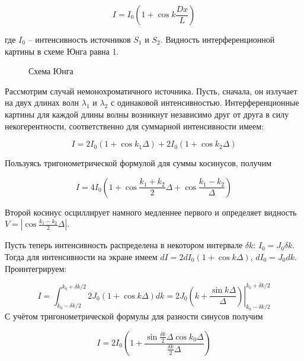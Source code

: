 \begin{equation}
    I = I_0 \left( 1 + \cos k \frac{D x}{L} \right)
\end{equation}

\noindent
где $I_0$ -- интенсивность источников $S_1$ и $S_2$. Видность интерференционной картины в схеме Юнга равна 1.

\begin{figure}[htbp]
    \centering
    
    \caption{Схема Юнга}
    \label{fig:схема Юнга}
\end{figure}

Рассмотрим случай немонохроматичного источника. Пусть, сначала, он излучает на двух длинах волн $\lambda_1$ и $\lambda_2$ с одинаковой интенсивностью. Интерференционные картины для каждой длины волны возникнут независимо друг от друга в силу некогерентности, соответственно для суммарной интенсивности имеем:

\begin{equation*}
    I = 2 I_0 (1 + \cos k_1 \Delta) + 2 I_0 (1 + \cos k_2 \Delta)
\end{equation*}

\noindent
Пользуясь тригонометрической формулой для суммы косинусов, получим

\begin{equation}
    I = 4 I_0 ( 1 + \cos \frac{k_1 + k_2}{2} \Delta + \cos \frac{k_1 - k_2}{\Delta})
\end{equation}

\noindent
Второй косинус осциллирует намного медленнее первого и определяет видность $V = \left| \cos \frac{k_1 - k_2}{2} \Delta \right|$.

Пусть теперь интенсивность распределена в некотором интервале $\delta k$: $I_0 = J_0 \delta k$. Тогда для интенсивности на экране имеем $dI = 2 d I_0 \left( 1 + \cos k \Delta \right)$, $d I_0 = J_0 d k$. Проинтегрируем:

\begin{equation*}
    I = \int_{k_0 - \delta k / 2}^{k_0 + \delta k / 2} 2 J_0 \left( 1 + \cos k \Delta \right) d k = \left. 2 J_0 \left( k + \frac{\sin k \Delta}{\Delta} \right) \right|_{k_0 - \delta k / 2}^{k_0 + \delta k / 2}
\end{equation*}
\noindent
С учётом тригонометрической формулы для разности синусов получим

\begin{equation}
    I = 2 I_0 \left( 1 + \frac{\sin \frac{\delta k}{2} \Delta \cos k_0 \Delta}{\frac{\delta k}{2} \Delta} \right)
\end{equation}

